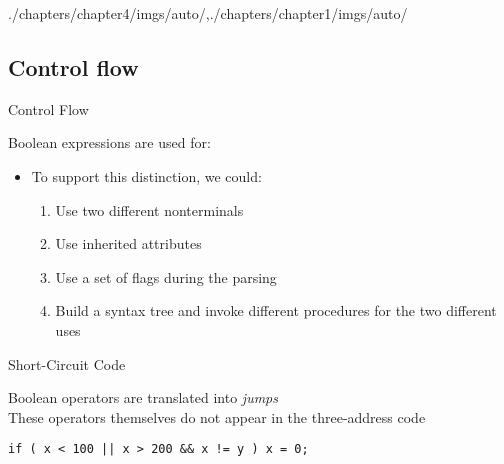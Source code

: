 \begin{graphicspathcontext}{{./chapters/chapter4/imgs/auto/},{./chapters/chapter1/imgs/auto/}}
\begin{bibunit}[apalike]
\subsection{Control flow}
\subsectiontableofcontentslide

\begin{frame}{Control Flow}
	\vspace{.25cm}
	\begin{block}{Boolean expressions are used for:}
		\begin{center}
			\hspace{1cm}
		\end{center}
	\end{block}
	\begin{itemize}
	\item To support this distinction, we could:
		\begin{enumerate}
		\item Use two different nonterminals
		\item Use inherited attributes
		\item Use a set of flags during the parsing
		\item Build a syntax tree and invoke different procedures for the two different uses
		\end{enumerate}
	\end{itemize}
\end{frame}

\begin{frame}[t,fragile]{Short-Circuit Code}
	\begin{definition}
		Boolean operators are translated into \emph{jumps} \\
		These operators themselves do not appear in the three-address code
	\end{definition}
	\vspace{.25cm}
	\vspace{.25cm}
	\begin{example}
		\begin{lstlisting}[style=lststyle-java]
if ( x < 100 || x > 200 && x != y ) x = 0;
		\end{lstlisting}
		\vspace{-.5cm}
		\begin{tac}[.6\linewidth]
		\tacdots[L2]
		\end{tac}
	\end{example}
\end{frame}


\end{bibunit}
\end{graphicspathcontext}
